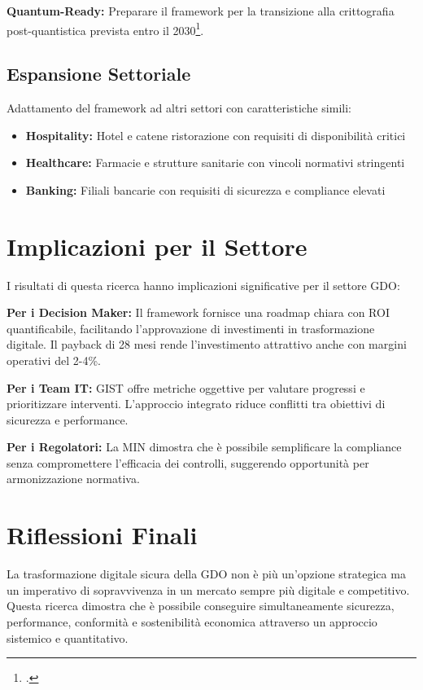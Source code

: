 \textbf{Quantum-Ready:} Preparare il framework per la transizione alla crittografia post-quantistica prevista entro il 2030\footcite{nistcsf2024}.

\subsection{Espansione Settoriale}
\label{subsec:espansione}

Adattamento del framework ad altri settori con caratteristiche simili:
\begin{itemize}
\item \textbf{Hospitality:} Hotel e catene ristorazione con requisiti di disponibilità critici
\item \textbf{Healthcare:} Farmacie e strutture sanitarie con vincoli normativi stringenti
\item \textbf{Banking:} Filiali bancarie con requisiti di sicurezza e compliance elevati
\end{itemize}

\section{Implicazioni per il Settore}
\label{sec:implicazioni}

I risultati di questa ricerca hanno implicazioni significative per il settore GDO:

\textbf{Per i Decision Maker:} Il framework fornisce una roadmap chiara con ROI quantificabile, facilitando l'approvazione di investimenti in trasformazione digitale. Il payback di 28 mesi rende l'investimento attrattivo anche con margini operativi del 2-4\%.

\textbf{Per i Team IT:} GIST offre metriche oggettive per valutare progressi e prioritizzare interventi. L'approccio integrato riduce conflitti tra obiettivi di sicurezza e performance.

\textbf{Per i Regolatori:} La MIN dimostra che è possibile semplificare la compliance senza compromettere l'efficacia dei controlli, suggerendo opportunità per armonizzazione normativa.

\section{Riflessioni Finali}
\label{sec:riflessioni}

La trasformazione digitale sicura della GDO non è più un'opzione strategica ma un imperativo di sopravvivenza in un mercato sempre più digitale e competitivo. Questa ricerca dimostra che è possibile conseguire simultaneamente sicurezza, performance, conformità e sostenibilità economica attraverso un approccio sistemico e quantitativo.

